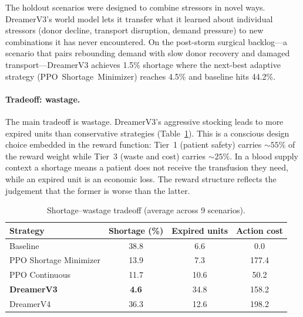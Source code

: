The holdout scenarios were designed to combine stressors in novel ways.
DreamerV3's world model lets it transfer what it learned about individual
stressors (donor decline, transport disruption, demand pressure) to new
combinations it has never encountered.  On the post-storm surgical
backlog---a scenario that pairs rebounding demand with slow donor recovery
and damaged transport---DreamerV3 achieves 1.5\% shortage where the
next-best adaptive strategy (PPO~Shortage~Minimizer) reaches 4.5\% and
baseline hits 44.2\%.

\paragraph{Tradeoff: wastage.}

The main tradeoff is wastage.  DreamerV3's aggressive stocking leads to
more expired units than conservative strategies
(Table~\ref{tab:tradeoff}).  This is a conscious design choice embedded in
the reward function: Tier~1 (patient safety) carries ${\sim}55\%$ of the
reward weight while Tier~3 (waste and cost) carries ${\sim}25\%$.  In a
blood supply context a shortage means a patient does not receive the
transfusion they need, while an expired unit is an economic loss.  The
reward structure reflects the judgement that the former is worse than the
latter.

\begin{table}[htbp]
\centering
\caption{Shortage--wastage tradeoff (average across 9 scenarios).}
\label{tab:tradeoff}
\small
\begin{tabular}{@{}lccc@{}}
\toprule
\textbf{Strategy}
    & \textbf{Shortage (\%)}
    & \textbf{Expired units}
    & \textbf{Action cost} \\
\midrule
Baseline               & 38.8 &  6.6 &   0.0 \\
PPO Shortage Minimizer & 13.9 &  7.3 & 177.4 \\
PPO Continuous         & 11.7 & 10.6 &  50.2 \\
\textbf{DreamerV3}     & \textbf{4.6}  & 34.8 & 158.2 \\
DreamerV4              & 36.3 & 12.6 & 198.2 \\
\bottomrule
\end{tabular}
\end{table}
